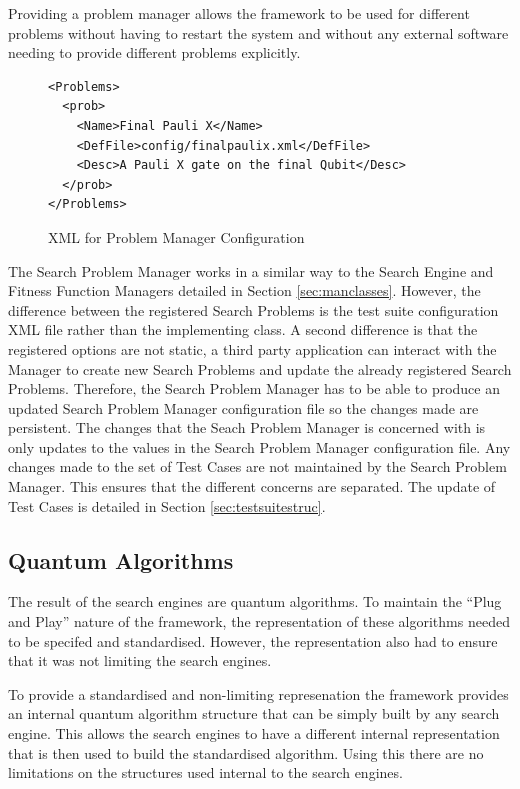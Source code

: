 Providing a problem manager allows the framework to be used for different problems without having to restart the system and without any external software needing to provide different problems explicitly.

\lstset{language=XML}
\begin{figure}
\begin{lstlisting}
<Problems>
  <prob>
    <Name>Final Pauli X</Name>
    <DefFile>config/finalpaulix.xml</DefFile>
    <Desc>A Pauli X gate on the final Qubit</Desc>
  </prob>
</Problems>
\end{lstlisting}
\caption{XML for Problem Manager Configuration}
\label{code:probmanconfig}
\end{figure}

The Search Problem Manager works in a similar way to the Search Engine and Fitness Function Managers detailed in Section \ref{sec:manclasses}.
However, the difference between the registered Search Problems is the test suite configuration XML file rather than the implementing class.
A second difference is that the registered options are not static, a third party application can interact with the Manager to create new Search Problems and update the already registered Search Problems.
Therefore, the Search Problem Manager has to be able to produce an updated Search Problem Manager configuration file so the changes made are persistent.
The changes that the Seach Problem Manager is concerned with is only updates to the values in the Search Problem Manager configuration file.
Any changes made to the set of Test Cases are not maintained by the Search Problem Manager.
This ensures that the different concerns are separated.
The update of Test Cases is detailed in Section \ref{sec:testsuitestruc}.

\subsection{Quantum Algorithms}
\label{sec:quantalgs}
The result of the search engines are quantum algorithms.
To maintain the ``Plug and Play'' nature of the framework, the representation of these algorithms needed to be specifed and standardised.
However, the representation also had to ensure that it was not limiting the search engines.

To provide a standardised and non-limiting represenation the framework provides an internal quantum algorithm structure that can be simply built by any search engine.
This allows the search engines to have a different internal representation that is then used to build the standardised algorithm.
Using this there are no limitations on the structures used internal to the search engines.

